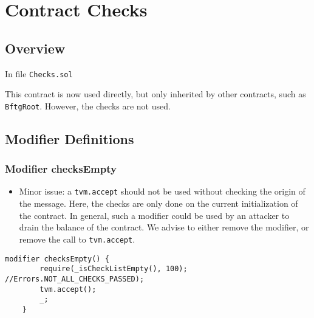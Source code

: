 
\chapter{Contract Checks}

\minitoc

\section{Overview}

In file {\tt Checks.sol}

This contract is now used directly, but only inherited by other
contracts, such as {\tt BftgRoot}. However, the checks are not used.

\section{Modifier Definitions}

\subsection{Modifier checksEmpty}

\begin{itemize}
\item Minor issue: a {\tt tvm.accept} should not be used without
  checking the origin of the message. Here, the checks are only done
  on the current initialization of the contract. In general, such a
  modifier could be used by an attacker to drain the balance of the
  contract. We advise to either remove the modifier, or remove the
  call to {\tt tvm.accept}.
\end{itemize}

\begin{lstlisting}[firstnumber=12]
    modifier checksEmpty() {
        require(_isCheckListEmpty(), 100); //Errors.NOT_ALL_CHECKS_PASSED);
        tvm.accept();
        _;
    }
\end{lstlisting}
